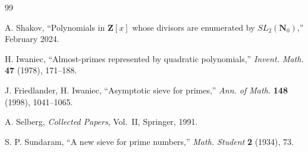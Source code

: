 \documentclass[11pt]{article}
\theoremstyle{definition}
\newcommand{\Nz}{\mathbf{N}_0}
\newcommand{\Z}{\mathbf{Z}}
\newcommand{\SLNz}{SL_2(\Nz)}
\begin{document}
\begin{thebibliography}{99}

A. Shakov, ``Polynomials in $\Z[x]$ whose divisors are enumerated by $\SLNz$,'' February 2024.

H. Iwaniec, ``Almost-primes represented by quadratic polynomials,'' \emph{Invent. Math.} \textbf{47} (1978), 171--188.

J. Friedlander, H. Iwaniec, ``Asymptotic sieve for primes,'' \emph{Ann. of Math.} \textbf{148} (1998), 1041--1065.

A. Selberg, \emph{Collected Papers}, Vol.~II, Springer, 1991.

S. P. Sundaram, ``A new sieve for prime numbers,'' \emph{Math. Student} \textbf{2} (1934), 73.

\end{thebibliography}
\end{document}
